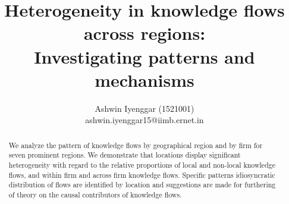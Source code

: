 \documentclass[12pt]{article}
\begin{document}
\title{Heterogeneity in knowledge flows across regions:\\  Investigating patterns and mechanisms}
\author{Ashwin Iyenggar  (1521001) \\ ashwin.iyenggar15@iimb.ernet.in} 


\maketitle
\thispagestyle{empty}

\begin{abstract}
We analyze the pattern of knowledge flows by geographical region and by firm for seven prominent regions. We demonstrate that locations display significant heterogeneity with regard to the relative proportions of local and non-local knowledge flows, and within firm and across firm knowledge flows. Specific patterns idiosyncratic distribution of flows are identified by location and suggestions are made for furthering of theory on the causal contributors of knowledge flows.
\end{abstract}
\end{document}
